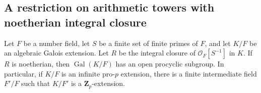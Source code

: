 \subsection{A restriction on arithmetic towers with noetherian integral closure}

\begin{proposition}
\label{C:A2-Galois-tower-procyclic}
Let $F$ be a number field, let $S$ be a finite set of finite primes
of $F$, and let $K/F$ be an algebraic Galois extension.  Let $R$ be
the integral closure of $\mathcal O_F[S^{-1}]$ in $K$.  If $R$ is
noetherian, then $\operatorname{Gal}(K/F)$ has an open procyclic
subgroup.  In particular, if $K/F$ is an infinite pro-$p$ extension,
there is a finite intermediate field $F'/F$ such that $K/F'$ is a
$\mathbf Z_p$-extension.
\end{proposition}

